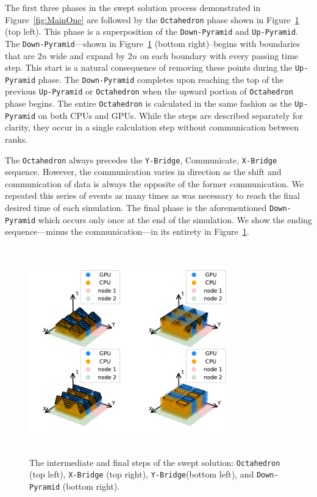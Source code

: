 \documentclass[preprints,article,accept,moreauthors,pdftex]{Definitions/mdpi}
\def\Up{\texttt{Up-Pyramid}}
\def\Down{\texttt{Down-Pyramid}}
\def\Oct{\texttt{Octahedron}}
\def\Xb{\texttt{X-Bridge}}
\def\Yb{\texttt{Y-Bridge}}
\begin{document}
\par
The first three phases in the swept solution process demonstrated in Figure~\ref{fig:MainOne} are followed by the \Oct{} phase shown in Figure~\ref{fig:MainTwo} (top left). This phase is a superposition of the \Down{} and \Up{}. The \Down{}---shown in Figure~\ref{fig:MainTwo} (bottom right)--begins with boundaries that are $2n$ wide and expand by $2n$ on each boundary with every passing time step. This start is a natural consequence of removing these points during the \Up{} phase. The \Down{} completes upon reaching the top of the previous \Up{} or \Oct{} when the upward portion of \Oct{} phase begins. The entire \Oct{} is calculated in the same fashion as the \Up{} on both CPUs and GPUs. While the steps are described separately for clarity, they occur in a single calculation step without communication between ranks. 

\par
The \Oct{} always precedes the \Yb{}, Communicate, \Xb{} sequence. However, the communication varies in direction as the shift and communication of data is always the opposite of the former communication. We repeated this series of events as many times as was necessary to reach the final desired time of each simulation. The final phase is the aforementioned \Down{} which occurs only once at the end of the simulation. We show the ending sequence---minus the communication---in its entirety in Figure~\ref{fig:MainTwo}. 


\begin{figure}[H]
    \begin{center}
        \includegraphics[height=9cm,width=0.78\textwidth, trim={1cm 0.6cm 0.25cm 0cm},clip]{figs/SubsPlot2.pdf}
    \end{center}
    \caption{The intermediate and final steps of the swept solution: \Oct{} (top left), \Xb{} (top right), \Yb (bottom left), and \Down{} (bottom right).}
    \label{fig:MainTwo}
\end{figure}
\end{document}
